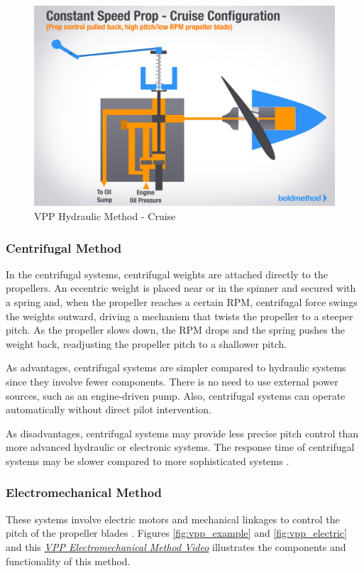 \begin{figure}[H]
    \centering
    \includegraphics[scale=0.25]{ch2/assets/vpp_hydro2.jpg}
    \caption{VPP Hydraulic Method - Cruise \cite{VPP5}}
    \label{fig:vpp_hydro2}
\end{figure}

\subsubsection{Centrifugal Method}
In the centrifugal systems, centrifugal weights are attached directly to the propellers.
An eccentric weight is placed near or in the spinner and secured with a spring and, when the propeller reaches a certain \gls{RPM}, centrifugal force swings the weights outward, driving a mechanism that twists the propeller to a steeper pitch.
As the propeller slows down, the \gls{RPM} drops and the spring pushes the weight back, readjusting the propeller pitch to a shallower pitch.

As advantages, centrifugal systems are simpler compared to hydraulic systems since they involve fewer components.
There is no need to use external power sources, such as an engine-driven pump.
Also, centrifugal systems can operate automatically without direct pilot intervention.

As disadvantages, centrifugal systems may provide less precise pitch control than more advanced hydraulic or electronic systems.
The response time of centrifugal systems may be slower compared to more sophisticated systems \cite{VPP2}.

\subsubsection{Electromechanical Method}
These systems involve electric motors and mechanical linkages to control the pitch of the propeller blades \cite{VPP8}.
Figures \ref{fig:vpp_example} and \ref{fig:vpp_electric} and this \href{https://www.youtube.com/watch?v=MpsBOQOUB-4}{\textit{VPP Electromechanical Method Video}} illustrates the components and functionality of this method.


